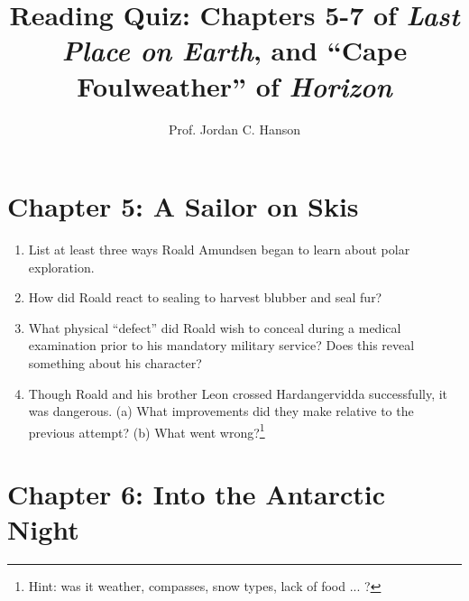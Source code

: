 \documentclass{article}
\begin{document}
\twocolumn

\title{Reading Quiz: Chapters 5-7 of \textit{Last Place on Earth}, and ``Cape Foulweather'' of \textit{Horizon}}
\author{Prof. Jordan C. Hanson}

\maketitle

\section{Chapter 5: A Sailor on Skis}

\begin{enumerate}
\item List at least three ways Roald Amundsen began to learn about polar exploration. \\ \vspace{2cm}
\item How did Roald react to sealing to harvest blubber and seal fur? \\ \vspace{2cm}
\item What physical ``defect'' did Roald wish to conceal during a medical examination prior to his mandatory military service? Does this reveal something about his character? \\ \vspace{2cm}
\item Though Roald and his brother Leon crossed Hardangervidda successfully, it was dangerous.  (a) What improvements did they make relative to the previous attempt?  (b) What went wrong?\footnote{Hint: was it weather, compasses, snow types, lack of food ... ?}\\ \vspace{2cm}
\end{enumerate}

\section{Chapter 6: Into the Antarctic Night}
\end{document}
